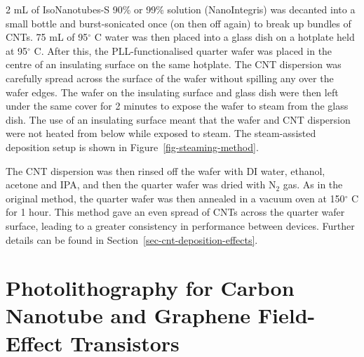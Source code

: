 \documentclass[
  a4paper,
]{scrbook}
\begin{document}
2 mL of IsoNanotubes-S 90\% or 99\% solution (NanoIntegris) was decanted
into a small bottle and burst-sonicated once (on then off again) to
break up bundles of CNTs. 75 mL of 95\(^\circ\) C water was then placed
into a glass dish on a hotplate held at 95\(^\circ\) C. After this, the
PLL-functionalised quarter wafer was placed in the centre of an
insulating surface on the same hotplate. The CNT dispersion was
carefully spread across the surface of the wafer without spilling any
over the wafer edges. The wafer on the insulating surface and glass dish
were then left under the same cover for 2 minutes to expose the wafer to
steam from the glass dish. The use of an insulating surface meant that
the wafer and CNT dispersion were not heated from below while exposed to
steam. The steam-assisted deposition setup is shown in
Figure~\ref{fig-steaming-method}.

The CNT dispersion was then rinsed off the wafer with DI water, ethanol,
acetone and IPA, and then the quarter wafer was dried with N\(_2\) gas.
As in the original method, the quarter wafer was then annealed in a
vacuum oven at 150\(^\circ\) C for 1 hour. This method gave an even
spread of CNTs across the quarter wafer surface, leading to a greater
consistency in performance between devices. Further details can be found
in Section~\ref{sec-cnt-deposition-effects}.

\hypertarget{photolithography-for-carbon-nanotube-and-graphene-field-effect-transistors}{%
\section{Photolithography for Carbon Nanotube and Graphene Field-Effect
Transistors}\label{photolithography-for-carbon-nanotube-and-graphene-field-effect-transistors}}
\end{document}
